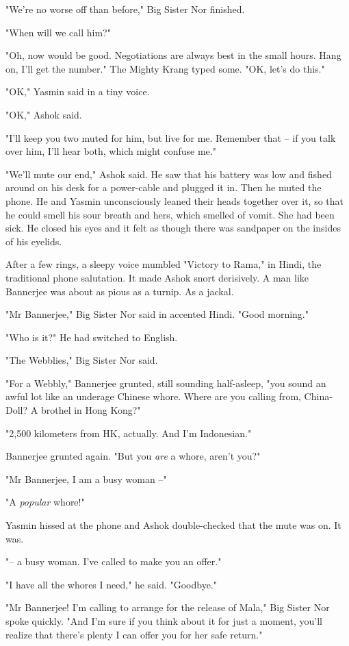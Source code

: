 "We're no worse off than before," Big Sister Nor finished.

"When will we call him?"

"Oh, now would be good. Negotiations are always best in the small
hours. Hang on, I'll get the number." The Mighty Krang typed some.
"OK, let's do this."

"OK," Yasmin said in a tiny voice.

"OK," Ashok said.

"I'll keep you two muted for him, but live for me. Remember that --
if you talk over him, I'll hear both, which might confuse me."

"We'll mute our end," Ashok said. He saw that his battery was low
and fished around on his desk for a power-cable and plugged it in.
Then he muted the phone. He and Yasmin unconsciously leaned their
heads together over it, so that he could smell his sour breath and
hers, which smelled of vomit. She had been sick. He closed his eyes
and it felt as though there was sandpaper on the insides of his
eyelids.

After a few rings, a sleepy voice mumbled "Victory to Rama," in
Hindi, the traditional phone salutation. It made Ashok snort
derisively. A man like Bannerjee was about as pious as a turnip. As
a jackal.

"Mr Bannerjee," Big Sister Nor said in accented Hindi. "Good
morning."

"Who is it?" He had switched to English.

"The Webblies," Big Sister Nor said.

"For a Webbly," Bannerjee grunted, still sounding half-asleep, "you
sound an awful lot like an underage Chinese whore. Where are you
calling from, China-Doll? A brothel in Hong Kong?"

"2,500 kilometers from HK, actually. And I'm Indonesian."

Bannerjee grunted again. "But you \emph{are} a whore, aren't you?"

"Mr Bannerjee, I am a busy woman --"

"A \emph{popular} whore!"

Yasmin hissed at the phone and Ashok double-checked that the mute
was on. It was.

"-- a busy woman. I've called to make you an offer."

"I have all the whores I need," he said. "Goodbye."

"Mr Bannerjee! I'm calling to arrange for the release of Mala," Big
Sister Nor spoke quickly. "And I'm sure if you think about it for
just a moment, you'll realize that there's plenty I can offer you
for her safe return."

